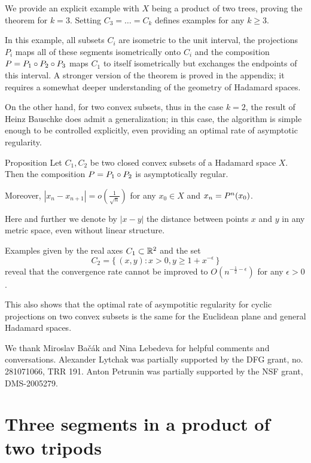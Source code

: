 \documentclass[a4paper,10pt]{article}
\begin{document}

We provide an explicit example with $X$ being a product of two trees, proving the theorem for $k=3$.
Setting $C_3=\dots=C_k$ defines examples for any $k\geq 3$.

In this example, all subsets $C_i$ are isometric to the unit interval, the projections $P_i$ maps all of these segments isometrically onto $C_i$ and the composition $P\z=P_1\circ P_2\circ P_3$ maps $C_1$ to itself isometrically but exchanges the endpoints
of this interval.
A stronger version of the theorem is proved in the appendix;
it requires a somewhat deeper understanding of the geometry of Hadamard spaces.

On the other hand, for two convex subsets, thus in the case $k=2$,  the result of Heinz Bauschke \cite{bauschke}  does admit a generalization;  in this case, the algorithm is simple enough to be controlled explicitly, even providing an optimal rate of asymptotic regularity.


\begin{thm}{Proposition} \label{prop}
Let $C_1,C_2$ be two closed convex subsets of a Hadamard space $X$.
Then the composition $P\z=  P_1\circ P_2$ is asymptotically  regular.

Moreover, $|x_n-x_{n+1}| =o (\frac  {1} {\sqrt n})$ for any  $x_0\in X$ and $x_n \z= P^n (x_0)$.
\end{thm}

Here and further we denote by $|x-y|$ the distance between points $x$ and $y$ in any metric space, even without linear structure.

Examples given by the real axes $C_1 \subset \mathbb{R}^2$ and the set
\[C_2  = \{\,(x,y):x>0, y \geq 1+ x^{ -\epsilon}\,\}\]
reveal that the convergence rate cannot be improved to $O (n^{-\frac 1 2  -\epsilon})$ for any $\epsilon >0$. 

This also shows that the optimal rate of asympotitic regularity for cyclic projections on two convex subsets is the same for the Euclidean plane and general Hadamard spaces. 

We thank Miroslav Bačák and Nina Lebedeva for helpful comments and conversations.
Alexander Lytchak was partially supported by the DFG grant, no. 281071066, TRR 191.
Anton Petrunin was partially supported by the NSF grant, DMS-2005279.

\section{Three segments in a product of two tripods}\label{sec:tripods}
\end{document}
